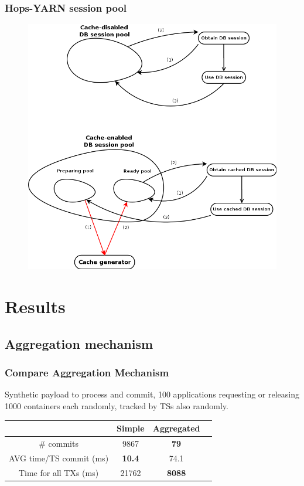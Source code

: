 \documentclass{beamer}
\begin{document}
\begin{frame}
\frametitle{Hops-YARN session pool}

\begin{figure}
\centering
\includegraphics[scale=0.27]{resources/db_session_pools.png}
\end{figure}
\end{frame}

\section{Results}
\subsection{Aggregation mechanism}
\begin{frame}
\frametitle{Compare Aggregation Mechanism}
Synthetic payload to process and commit, 100 applications requesting or releasing
1000 containers each randomly, tracked by TSs also randomly. \\[2em]

\centering
\begin{tabular}{| c | c | c | c |}
\hline
  & Simple & Aggregated \\
\hline
\# commits & 9867 & \textbf{79} \\
\hline
AVG time/TS commit (ms) & \textbf{10.4} & 74.1 \\
\hline
Time for all TXs (ms) & 21762 & \textbf{8088} \\
\hline
\end{tabular}
\end{frame}
\end{document}
